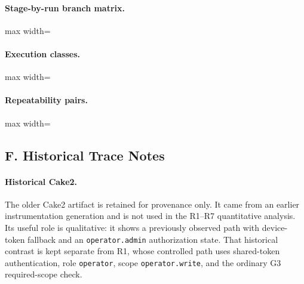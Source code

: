 \paragraph{Stage-by-run branch matrix.}
\begin{center}
\begin{adjustbox}{max width=\linewidth}

\end{adjustbox}
\end{center}

\paragraph{Execution classes.}
\begin{center}
\begin{adjustbox}{max width=\linewidth}

\end{adjustbox}
\end{center}

\paragraph{Repeatability pairs.}
\begin{center}
\begin{adjustbox}{max width=\linewidth}

\end{adjustbox}
\end{center}

\endgroup

\subsection*{F. Historical Trace Notes}

\paragraph{Historical Cake2.}
The older Cake2 artifact is retained for provenance only. It came from an
earlier instrumentation generation and is not used in the R1--R7
quantitative analysis. Its useful role is qualitative: it shows a
previously observed path with device-token fallback and an
\texttt{operator.admin} authorization state. That historical contrast is
kept separate from R1, whose controlled path uses shared-token
authentication, role \texttt{operator}, scope \texttt{operator.write}, and
the ordinary G3 required-scope check.

